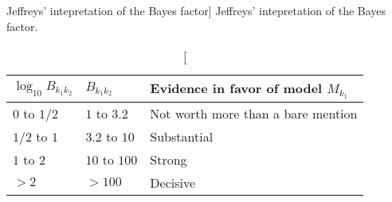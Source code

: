 \begin{table}[t]
  \UseAltLinespread
  \caption
  [Jeffreys' intepretation of the Bayes factor]
  {Jeffreys' intepretation of the Bayes factor.}
  \label{tab:bayes factor log10 scale}
  \begin{tabu}{X[1l]X[1l]X[5l]}
    \toprule
    $\log_{10} B_{k_1k_2}$ & $B_{k_1k_2}$ & Evidence in favor of model
    $M_{k_1}$ \\
    \midrule
    $0$ to $1/2$ & $1$ to $3.2$  & Not worth more than a bare mention \\
    $1/2$ to $1$ & $3.2$ to $10$ & Substantial \\
    $1$ to $2$   & $10$ to $100$ & Strong \\
    $>2$         & $>100$        & Decisive \\
    \bottomrule
  \end{tabu}
\end{table}
